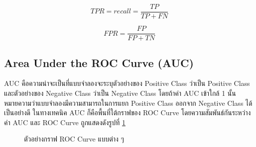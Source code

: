 \begin{equation}
  TPR = recall = \frac{TP}{TP + FN}
  \label{eq:tpr}
\end{equation}

\begin{equation}
  FPR = \frac{FP}{FP + TN}
  \label{eq:fpr}
\end{equation}

\subsection{Area Under the ROC Curve (AUC)}
AUC คือความน่าจะเป็นที่แบบจำลองจะระบุตัวอย่างของ Positive Class ว่าเป็น Positive Class และตัวอย่างของ Negative Class ว่าเป็น Negative Class 
โดยถ้าค่า AUC เข้าใกล้ 1 นั้นหมายความว่าแบบจำลองมีความสามารถในการแยก Positive Class ออกจาก Negative Class ได้เป็นอย่างดี 
ในทางเทคนิค AUC ก็คือพื้นที่ใต้กราฟของ ROC Curve โดยความสัมพันธ์กันระหว่างค่า AUC และ ROC Curve ถูกแสดงดังรูปที่ \ref{fig:roc}

\begin{figure}[h]
  \centering
  \caption{ตัวอย่างกราฟ ROC Curve แบบต่าง ๆ}
  \label{fig:roc}
\end{figure}
\FloatBarrier

